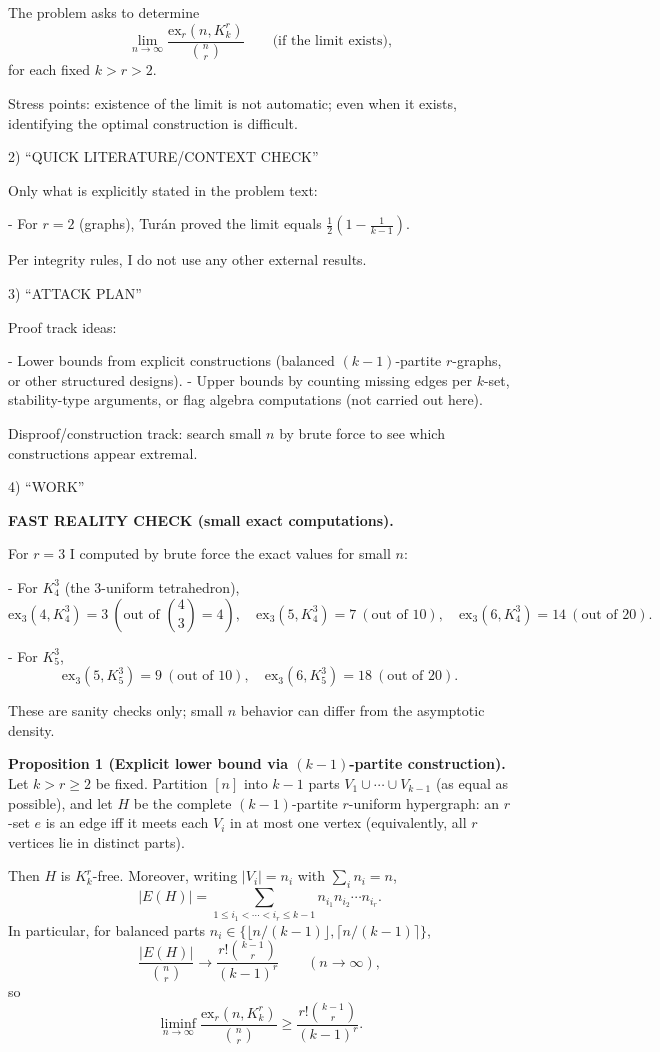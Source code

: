 The problem asks to determine
\[
\lim_{n\to\infty}\frac{\mathrm{ex}_r(n,K_k^r)}{\binom{n}{r}}\qquad\text{(if the limit exists),}
\]
for each fixed $k>r>2$.

Stress points: existence of the limit is not automatic; even when it exists, identifying the optimal construction is difficult.

2) “QUICK LITERATURE/CONTEXT CHECK”

Only what is explicitly stated in the problem text:

- For $r=2$ (graphs), Tur\'{a}n proved the limit equals $\frac12\left(1-\frac1{k-1}\right)$.

Per integrity rules, I do not use any other external results.

3) “ATTACK PLAN”

Proof track ideas:

- Lower bounds from explicit constructions (balanced $(k-1)$-partite $r$-graphs, or other structured designs).
- Upper bounds by counting missing edges per $k$-set, stability-type arguments, or flag algebra computations (not carried out here).

Disproof/construction track: search small $n$ by brute force to see which constructions appear extremal.

4) “WORK”

\textbf{FAST REALITY CHECK (small exact computations).}

For $r=3$ I computed by brute force the exact values for small $n$:

- For $K_4^3$ (the 3-uniform tetrahedron),
\[
\mathrm{ex}_3(4,K_4^3)=3\ (\text{out of }\binom43=4),\quad
\mathrm{ex}_3(5,K_4^3)=7\ (\text{out of }10),\quad
\mathrm{ex}_3(6,K_4^3)=14\ (\text{out of }20).
\]

- For $K_5^3$,
\[
\mathrm{ex}_3(5,K_5^3)=9\ (\text{out of }10),\quad
\mathrm{ex}_3(6,K_5^3)=18\ (\text{out of }20).
\]

These are sanity checks only; small $n$ behavior can differ from the asymptotic density.

\medskip
\textbf{Proposition 1 (Explicit lower bound via $(k-1)$-partite construction).}
Let $k>r\ge 2$ be fixed. Partition $[n]$ into $k-1$ parts $V_1\cup\cdots\cup V_{k-1}$ (as equal as possible), and let $H$ be the complete $(k-1)$-partite $r$-uniform hypergraph: an $r$-set $e$ is an edge iff it meets each $V_i$ in at most one vertex (equivalently, all $r$ vertices lie in distinct parts).

Then $H$ is $K_k^r$-free. Moreover, writing $|V_i|=n_i$ with $\sum_i n_i=n$,
\[
|E(H)|=\sum_{1\le i_1<\cdots<i_r\le k-1} n_{i_1}n_{i_2}\cdots n_{i_r}.
\]
In particular, for balanced parts $n_i\in\{\lfloor n/(k-1)\rfloor,\lceil n/(k-1)\rceil\}$,
\[
\frac{|E(H)|}{\binom{n}{r}} \to \frac{r!\binom{k-1}{r}}{(k-1)^r}
\qquad (n\to\infty),
\]
so
\[
\liminf_{n\to\infty}\frac{\mathrm{ex}_r(n,K_k^r)}{\binom{n}{r}}\ge \frac{r!\binom{k-1}{r}}{(k-1)^r}.
\]


